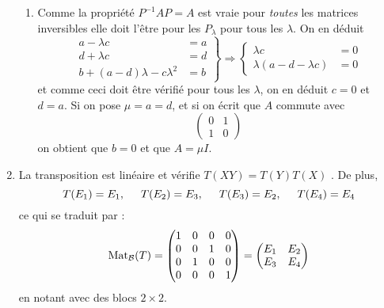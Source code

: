 \begin{enumerate}
\begin{enumerate}
 \item Comme la propriété $P^{-1}AP=A$ est vraie pour \emph{toutes} les matrices inversibles elle doit l'être pour les $P_\lambda$ pour tous les $\lambda$. On en déduit
\begin{displaymath}
 \left. 
\begin{aligned}
 a-\lambda c &=a \\ d+\lambda c &=d \\ b+(a-d)\lambda-c\lambda^2 &=b
\end{aligned}\right\rbrace 
\Rightarrow
\left\lbrace 
\begin{aligned}
 \lambda c&=0 \\ \lambda(a-d-\lambda c)&=0
\end{aligned}
\right. 
\end{displaymath}
et comme ceci doit être vérifié pour tous les $\lambda$, on en déduit $c=0$ et $d=a$. Si on pose $\mu=a=d$, et si on écrit que 
$A$ commute avec
\begin{displaymath}
 \begin{pmatrix}
  0 & 1 \\ 1 & 0
 \end{pmatrix}
\end{displaymath}
on obtient que $b=0$ et que $A=\mu I$.
\end{enumerate}

 \item La transposition est lin\'{e}aire et v\'{e}rifie $T(XY)=T(Y)T(X)$%
. De plus, 
\begin{displaymath}
 T(E_{1})=E_{1},\hspace{0,5cm} T(E_{2})=E_{3},\hspace{0,5cm} T(E_{3})=E_{2},\hspace{0,5cm}T(E_{4})=E_{4} 
\end{displaymath}
ce qui se traduit par : 
\begin{displaymath}
\operatorname{Mat}_{\mathcal{B}}(T)= 
\begin{pmatrix}
1 & 0 & 0 & 0 \\ 
0 & 0 & 1 & 0 \\ 
0 & 1 & 0 & 0 \\ 
0 & 0 & 0 & 1
\end{pmatrix}
= 
\begin{pmatrix}
E_{1} & E_{2} \\ 
E_{3} & E_{4}
\end{pmatrix}
\end{displaymath}
en notant avec des blocs $2\times 2$.
\end{enumerate}

